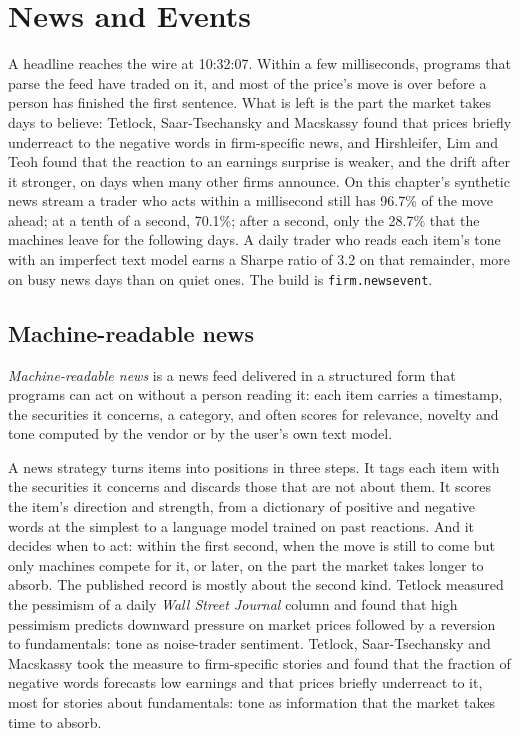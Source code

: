\chapter{News and Events}\label{ch:s1:news-and-events}

A headline reaches the wire at 10:32:07. Within a few milliseconds, programs that parse the feed have traded on it, and most of the price's move is over
before a person has finished the first sentence. What is left is the part the market takes days to believe: Tetlock, Saar-Tsechansky and Macskassy found
that prices briefly underreact to the negative words in firm-specific news, and Hirshleifer, Lim and Teoh found that the reaction to an earnings surprise
is weaker, and the drift after it stronger, on days when many other firms announce. On this chapter's synthetic news stream a trader who acts within a
millisecond still has 96.7\% of the move ahead; at a tenth of a second, 70.1\%; after a second, only the 28.7\% that the machines leave for the following
days. A daily trader who reads each item's tone with an imperfect text model earns a Sharpe ratio of 3.2 on that remainder, more on busy news days than on
quiet ones. The build is \texttt{firm.newsevent}.

\section{Machine-readable news}

\begin{definition}\label{def:s1:news-and-events:mrn}
\emph{Machine-readable news} is a news feed delivered in a structured form that programs can act on without a person reading
it: each item carries a timestamp, the securities it concerns, a category, and often scores for relevance, novelty and tone computed by the vendor or by
the user's own text model.
\end{definition}

A news strategy turns items into positions in three steps. It tags each item with the securities it concerns and discards those that are not about them.
It scores the item's direction and strength, from a dictionary of positive and negative words at the simplest to a language model trained on past
reactions. And it decides when to act: within the first second, when the move is still to come but only machines compete for it, or later, on the part
the market takes longer to absorb. The published record is mostly about the second kind. Tetlock measured the pessimism of a daily \emph{Wall Street
Journal} column and found that high pessimism predicts downward pressure on market prices followed by a reversion to fundamentals: tone as noise-trader
sentiment. Tetlock, Saar-Tsechansky and Macskassy took the measure to firm-specific stories and found that the fraction of negative words forecasts low
earnings and that prices briefly underreact to it, most for stories about fundamentals: tone as information that the market takes time to absorb.

